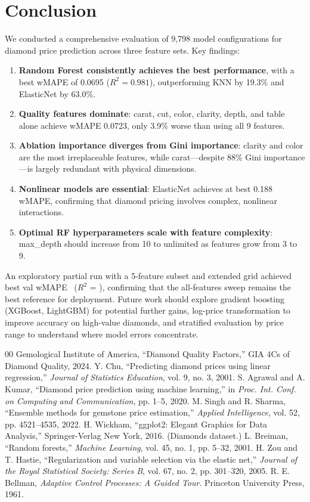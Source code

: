 \documentclass[conference]{IEEEtran}
\begin{document}
\section{Conclusion}

We conducted a comprehensive evaluation of 9,798 model configurations for diamond price prediction across three feature sets. Key findings:

\begin{enumerate}
\item \textbf{Random Forest consistently achieves the best performance}, with a best wMAPE of 0.0695 ($R^2=0.981$), outperforming KNN by 19.3\% and ElasticNet by 63.0\%.
\item \textbf{Quality features dominate}: carat, cut, color, clarity, depth, and table alone achieve wMAPE 0.0723, only 3.9\% worse than using all 9 features.
\item \textbf{Ablation importance diverges from Gini importance}: clarity and color are the most irreplaceable features, while carat---despite 88\% Gini importance---is largely redundant with physical dimensions.
\item \textbf{Nonlinear models are essential}: ElasticNet achieves at best 0.188 wMAPE, confirming that diamond pricing involves complex, nonlinear interactions.
\item \textbf{Optimal RF hyperparameters scale with feature complexity}: max\_depth should increase from 10 to unlimited as features grow from 3 to 9.
\end{enumerate}

\ifdefined\IncludePartialRun
An exploratory partial run with a 5-feature subset and extended grid achieved best val wMAPE \LocalBestWmapeVal\ ($R^2$ = \LocalBestRtwoVal), confirming that the all-features sweep remains the best reference for deployment.
\fi
Future work should explore gradient boosting (XGBoost, LightGBM) for potential further gains, log-price transformation to improve accuracy on high-value diamonds, and stratified evaluation by price range to understand where model errors concentrate.

\begin{thebibliography}{00}
 Gemological Institute of America, ``Diamond Quality Factors,'' GIA 4Cs of Diamond Quality, 2024.
 Y. Chu, ``Predicting diamond prices using linear regression,'' \textit{Journal of Statistics Education}, vol. 9, no. 3, 2001.
 S. Agrawal and A. Kumar, ``Diamond price prediction using machine learning,'' in \textit{Proc. Int. Conf. on Computing and Communication}, pp. 1--5, 2020.
 M. Singh and R. Sharma, ``Ensemble methods for gemstone price estimation,'' \textit{Applied Intelligence}, vol. 52, pp. 4521--4535, 2022.
 H. Wickham, ``ggplot2: Elegant Graphics for Data Analysis,'' Springer-Verlag New York, 2016. (Diamonds dataset.)
 L. Breiman, ``Random forests,'' \textit{Machine Learning}, vol. 45, no. 1, pp. 5--32, 2001.
 H. Zou and T. Hastie, ``Regularization and variable selection via the elastic net,'' \textit{Journal of the Royal Statistical Society: Series B}, vol. 67, no. 2, pp. 301--320, 2005.
 R. E. Bellman, \textit{Adaptive Control Processes: A Guided Tour}. Princeton University Press, 1961.
\end{thebibliography}
\end{document}
